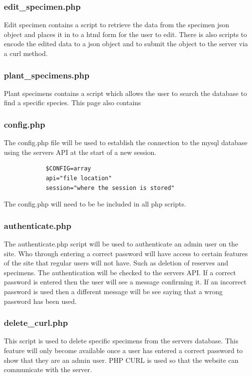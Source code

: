         
    \subsubsection{edit\_specimen.php}
        Edit specimen contains a script to retrieve the data from the specimen json object and places it in to a html form for the user to edit. There is also scripts to encode the edited data to a json object and to submit the object to the server via a curl method.

        
    \subsubsection{plant\_specimens.php}
        Plant specimens contains a script which allows the user to search the database to find a specific species. This page also contains 


    \subsubsection{config.php}
        The config.php file will be used to establish the connection to the mysql database using the servers API at the start of a new session.
        \begin{verbatim}
            $CONFIG=array
            api="file location"
            session="where the session is stored"
        \end{verbatim}
        The config.php will need to be be included in all php scripts.


    \subsubsection{authenticate.php}
        The authenticate.php script will be used to authenticate an admin user on the site. Who through entering a correct password will have access to certain features of the site that regular users will not have. Such as deletion of reserves and specimens. The authentication will be checked to the servers API. If a correct password is entered then the user will see a message confirming it. If an incorrect password is used then a different message will be see saying that a wrong password has been used.


    \subsubsection{delete\_curl.php}
        This script is used to delete specific specimens from the servers database. This feature will only become available once a user has entered a correct password to show that they are an admin user. PHP CURL is used so that the website can communicate with the server.


